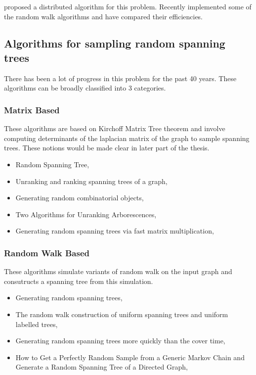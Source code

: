 \citet{10.1007/3-540-51687-5_27} proposed a distributed algorithm for this problem. Recently \citet{a11040053} implemented some of the random walk algorithms and have compared their efficiencies. 


\subsection{Algorithms for sampling random spanning trees}
There has been a lot of progress in this problem for the past 40 years. These algorithms can be broadly classified into 3 categories. 

\subsubsection{Matrix Based }
These algorithms are based on Kirchoff Matrix Tree theorem and involve computing determinants of the laplacian matrix of the graph  to sample spanning trees. These notions would be made clear in later part of the thesis.

\begin{itemize}
\item Random Spanning Tree, \cite{GUENOCHE1983214}
\item Unranking and ranking spanning trees of a graph, \cite{COLBOURN1989271}
\item Generating random combinatorial objects, \cite{KULKARNI1990185}
\item Two Algorithms for Unranking Arborescences, \cite{COLBOURN1996268}
\item Generating random spanning trees via fast matrix multiplication, \cite{harvey2016generating}
\end{itemize}


\subsubsection{Random Walk Based}
These algorithms simulate variants of random walk on the input graph and consutructs a spanning tree from this simulation.
\begin{itemize}
\item Generating random spanning trees, \cite{63516}
\item The random walk construction of uniform spanning trees and uniform labelled trees, \cite{aldous1990random}
\item Generating random spanning trees more quickly than the cover time, \cite{10.1145/237814.237880}
\item How to Get a Perfectly Random Sample from a Generic Markov Chain and Generate a Random Spanning Tree of a Directed Graph, \cite{Propp1998HowTG}

\end{itemize}



